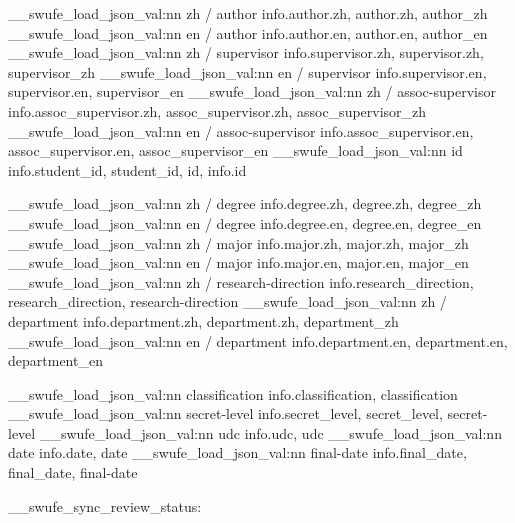 {    %
    \__swufe_load_json_val:nn { zh / author } { {info.author.zh}, {author.zh}, {author_zh} }
    \__swufe_load_json_val:nn { en / author } { {info.author.en}, {author.en}, {author_en} }
    \__swufe_load_json_val:nn { zh / supervisor } { {info.supervisor.zh}, {supervisor.zh}, {supervisor_zh} }
    \__swufe_load_json_val:nn { en / supervisor } { {info.supervisor.en}, {supervisor.en}, {supervisor_en} }
    \__swufe_load_json_val:nn { zh / assoc-supervisor } { {info.assoc_supervisor.zh}, {assoc_supervisor.zh}, {assoc_supervisor_zh} }
    \__swufe_load_json_val:nn { en / assoc-supervisor } { {info.assoc_supervisor.en}, {assoc_supervisor.en}, {assoc_supervisor_en} }
    \__swufe_load_json_val:nn { id } { {info.student_id}, {student_id}, {id}, {info.id} }

    \__swufe_load_json_val:nn { zh / degree } { {info.degree.zh}, {degree.zh}, {degree_zh} }
    \__swufe_load_json_val:nn { en / degree } { {info.degree.en}, {degree.en}, {degree_en} }
    \__swufe_load_json_val:nn { zh / major } { {info.major.zh}, {major.zh}, {major_zh} }
    \__swufe_load_json_val:nn { en / major } { {info.major.en}, {major.en}, {major_en} }
    \__swufe_load_json_val:nn { zh / research-direction } { {info.research_direction}, {research_direction}, {research-direction} }
    \__swufe_load_json_val:nn { zh / department } { {info.department.zh}, {department.zh}, {department_zh} }
    \__swufe_load_json_val:nn { en / department } { {info.department.en}, {department.en}, {department_en} }

    \__swufe_load_json_val:nn { classification } { {info.classification}, {classification} }
    \__swufe_load_json_val:nn { secret-level } { {info.secret_level}, {secret_level}, {secret-level} }
    \__swufe_load_json_val:nn { udc } { {info.udc}, {udc} }
    \__swufe_load_json_val:nn { date } { {info.date}, {date} }
    \__swufe_load_json_val:nn { final-date } { {info.final_date}, {final_date}, {final-date} }
  }

\__swufe_sync_review_status:
\ExplSyntaxOff


% 

